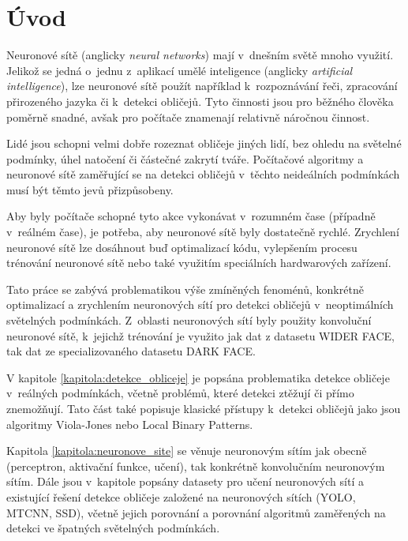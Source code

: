 \chapter{Úvod}
\label{kapitola:uvod}
Neuronové sítě (anglicky \emph{neural networks}) mají v~dnešním světě mnoho využití. Jelikož se jedná o~jednu z~aplikací umělé inteligence (anglicky \emph{artificial intelligence}), lze neuronové sítě použít například k~rozpoznávání řeči, zpracování přirozeného jazyka či k~detekci obličejů.
Tyto činnosti jsou pro běžného člověka poměrně snadné, avšak pro počítače znamenají relativně náročnou činnost.

Lidé jsou schopni velmi dobře rozeznat obličeje jiných lidí, bez ohledu na světelné podmínky, úhel natočení či částečné zakrytí tváře. Počítačové algoritmy a neuronové sítě zaměřující se na detekci obličejů v~těchto neideálních podmínkách musí být těmto jevů přizpůsobeny.

Aby byly počítače schopné tyto akce vykonávat v~rozumném čase (případně v~reálném čase), je potřeba, aby neuronové sítě byly dostatečně rychlé. Zrychlení neuronové sítě lze dosáhnout buď optimalizací kódu, vylepšením procesu trénování neuronové sítě nebo také využitím speciálních hardwarových zařízení. 

Tato práce se zabývá problematikou výše zmíněných fenoménů, konkrétně optimalizací a zrychlením neuronových sítí pro detekci obličejů v~neoptimálních světelných podmínkách. Z~oblasti neuronových sítí byly použity konvoluční neuronové sítě, k~jejichž trénování je využito jak dat z datasetu WIDER FACE, tak dat ze specializovaného datasetu DARK FACE. 

V kapitole \ref{kapitola:detekce_obliceje} je popsána problematika detekce obličeje v~reálných podmínkách, včetně problémů, které detekci ztěžují či přímo znemožňují. Tato část také popisuje klasické přístupy k~detekci obličejů jako jsou algoritmy Viola-Jones nebo Local Binary Patterns.

Kapitola \ref{kapitola:neuronove_site} se věnuje neuronovým sítím jak obecně (perceptron, aktivační funkce, učení), tak konkrétně konvolučním neuronovým sítím. Dále jsou v~kapitole popsány datasety pro učení neuronových sítí a existující řešení detekce obličeje založené na neuronových sítích (YOLO, MTCNN, SSD), včetně jejich porovnání a porovnání algoritmů zaměřených na detekci ve špatných světelných podmínkách.

